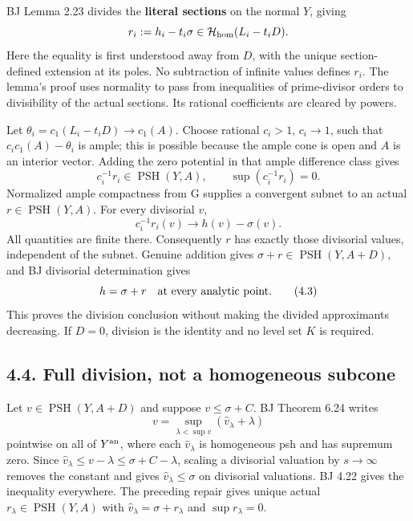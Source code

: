 \documentclass[
  10pt,
]{article}
\begin{document}
BJ Lemma 2.23 divides the \textbf{literal sections} on the normal \(Y\),
giving \[
 r_i:=h_i-t_i\sigma\in\mathcal H_{\rm hom}(L_i-t_iD).
\] Here the equality is first understood away from \(D\), with the
unique section-defined extension at its poles. No subtraction of
infinite values defines \(r_i\). The lemma's proof uses normality to
pass from inequalities of prime-divisor orders to divisibility of the
actual sections. Its rational coefficients are cleared by powers.

Let \(\theta_i=c_1(L_i-t_iD)\to c_1(A)\). Choose rational \(c_i>1\),
\(c_i\to1\), such that \(c_i c_1(A)-\theta_i\) is ample; this is
possible because the ample cone is open and \(A\) is an interior vector.
Adding the zero potential in that ample difference class gives \[
 c_i^{-1}r_i\in\operatorname{PSH}(Y,A),\qquad
 \sup(c_i^{-1}r_i)=0.
\] Normalized ample compactness from G supplies a convergent subnet to
an actual \(r\in\operatorname{PSH}(Y,A)\). For every divisorial \(v\),
\[
 c_i^{-1}r_i(v)\longrightarrow h(v)-\sigma(v).
 \tag{4.2}
\] All quantities are finite there. Consequently \(r\) has exactly those
divisorial values, independent of the subnet. Genuine addition gives
\(\sigma+r\in\operatorname{PSH}(Y,A+D)\), and BJ divisorial
determination gives \[
 h=\sigma+r\quad\hbox{at every analytic point.}
 \tag{4.3}
\] This proves the division conclusion without making the divided
approximants decreasing. If \(D=0\), division is the identity and no
level set \(K\) is required.

\subsection{4.4. Full division, not a homogeneous
subcone}\label{full-division-not-a-homogeneous-subcone}

Let \(v\in\operatorname{PSH}(Y,A+D)\) and suppose \(v\leq\sigma+C\). BJ
Theorem 6.24 writes \[
 v=\sup_{\lambda<\sup v}(\widehat v_\lambda+\lambda)
 \tag{4.4}
\] pointwise on all of \(Y^{\rm an}\), where each \(\widehat v_\lambda\)
is homogeneous psh and has supremum zero. Since
\(\widehat v_\lambda\leq v-\lambda\leq\sigma+C-\lambda\), scaling a
divisorial valuation by \(s\to\infty\) removes the constant and gives
\(\widehat v_\lambda\leq\sigma\) on divisorial valuations. BJ 4.22 gives
the inequality everywhere. The preceding repair gives unique actual
\(r_\lambda\in\operatorname{PSH}(Y,A)\) with
\(\widehat v_\lambda=\sigma+r_\lambda\) and \(\sup r_\lambda=0\).
\end{document}
